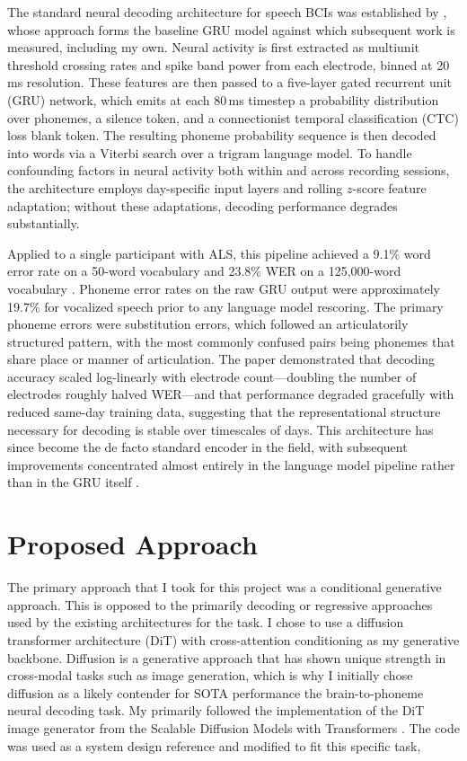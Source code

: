 \documentclass{article}
\begin{document}
The standard neural decoding architecture for speech BCIs was established by
\citet{willett2023high}, whose approach forms the baseline GRU model against which subsequent work is
measured, including my own. Neural activity is first extracted as multiunit threshold crossing rates and spike band
power from each electrode, binned at 20\,ms resolution. These
features are then passed to a five-layer gated recurrent unit (GRU) network, which emits at
each 80\,ms timestep a probability distribution over phonemes, a silence token, and a
connectionist temporal classification (CTC) loss blank token. The resulting phoneme probability
sequence is then decoded into words via a Viterbi search over a trigram language model. To
handle confounding factors in neural activity both within and across recording sessions, the
architecture employs day-specific input layers and rolling $z$-score feature adaptation; without
these adaptations, decoding performance degrades substantially.

Applied to a single participant with ALS, this pipeline achieved a 9.1\% word error rate on a
50-word vocabulary and 23.8\% WER on a 125{,}000-word vocabulary \citep{willett2023high}.
Phoneme error rates on the raw GRU output were approximately 19.7\% for vocalized speech
prior to any language model rescoring. The primary phoneme errors were substitution errors, which followed an articulatorily
structured pattern, with the most
commonly confused pairs being phonemes that share place or manner of articulation.  The paper  demonstrated that decoding
accuracy scaled log-linearly with electrode count---doubling the number of electrodes roughly
halved WER---and that performance degraded gracefully with reduced same-day training data,
suggesting that the representational structure necessary for decoding is stable over timescales
of days. This architecture has since become the de facto standard encoder in the field, with
subsequent improvements concentrated almost entirely in the language model pipeline rather
than in the GRU itself \citep{willett2024lessons}.

\section{Proposed Approach}
\label{sec:approach}

The primary approach that I took for this project was a conditional generative approach.
This is opposed to the primarily decoding or regressive approaches used by the existing architectures for the task.
I chose to use a diffusion transformer architecture (DiT) with cross-attention conditioning as my generative backbone.
Diffusion is a generative approach that has shown unique strength in cross-modal tasks such as image generation, which is why I initially chose
diffusion as a likely contender for SOTA performance the brain-to-phoneme neural decoding task. 
My primarily followed the implementation of the DiT image generator from the Scalable Diffusion Models with Transformers \citep{peebles2022scalable}.
The code was used as a system design reference and modified to fit this specific task, 
 
\end{document}
